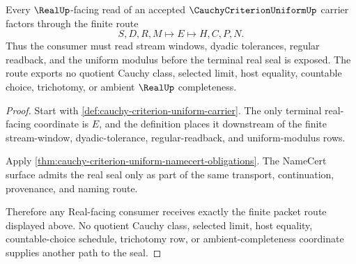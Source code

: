 \begin{theorem}
\label{thm:cauchy-criterion-uniform-real-seal-route}
Every $\RealUp$-facing read of an accepted $\CauchyCriterionUniformUp$ carrier factors through the finite route
$$
S,D,R,M \longmapsto E \longmapsto H,C,P,N .
$$
Thus the consumer must read stream windows, dyadic tolerances, regular readback, and the uniform modulus before the terminal real seal is exposed. The route exports no quotient Cauchy class, selected limit, host equality, countable choice, trichotomy, or ambient $\RealUp$ completeness.
\end{theorem}
\begin{proof}
Start with \autoref{def:cauchy-criterion-uniform-carrier}. The only terminal real-facing coordinate is $E$, and the definition places it downstream of the finite stream-window, dyadic-tolerance, regular-readback, and uniform-modulus rows.

Apply \autoref{thm:cauchy-criterion-uniform-namecert-obligations}. The NameCert surface admits the real seal only as part of the same transport, continuation, provenance, and naming route.

Therefore any Real-facing consumer receives exactly the finite packet route displayed above. No quotient Cauchy class, selected limit, host equality, countable-choice schedule, trichotomy row, or ambient-completeness coordinate supplies another path to the seal.
\end{proof}


\begin{closurestatus}{\CauchyCriterionUniformUp}
  \theoryclosure{\seedClosure}
  \formalstatus{\unformalizedV}
\end{closurestatus}
